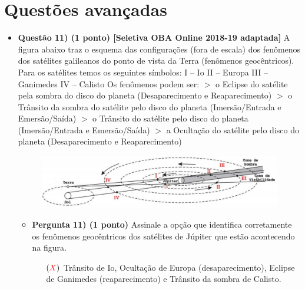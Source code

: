 \documentclass[a4paper, 12pt]{article}
\newcommand{\red}[1]{\textcolor{red}{#1}}
\begin{document}
    \section*{Questões avançadas}
        \begin{flushleft} \begin{itemize}
            \item \textbf{Questão 11) (1 ponto) [Seletiva OBA Online 2018-19 adaptada]} A figura abaixo traz o esquema das configurações (fora de escala) dos fenômenos dos satélites galileanos do ponto de vista da Terra (fenômenos geocêntricos). Para os satélites temos os seguintes símbolos: \linebreak\linebreak I – Io \linebreak II – Europa \linebreak III – Ganimedes \linebreak IV – Calisto \linebreak\linebreak Os fenômenos podem ser: \linebreak $>$ o Eclipse do satélite pela sombra do disco do planeta (Desaparecimento e Reaparecimento) \linebreak $>$ o Trânsito da sombra do satélite pelo disco do planeta (Imersão/Entrada e Emersão/Saída) \linebreak $>$ o Trânsito do satélite pelo disco do planeta (Imersão/Entrada e Emersão/Saída) \linebreak $>$ a Ocultação do satélite pelo disco do planeta (Desaparecimento e Reaparecimento)
                \begin{figure}[H]
                    \centering
                    \includegraphics[scale=0.4]{img/11.png}
                \end{figure}
                \begin{itemize}
                    \item \textbf{Pergunta 11) (1 ponto)} Assinale a opção que identifica corretamente os fenômenos geocêntricos dos satélites de Júpiter que estão acontecendo na figura.
                        \begin{itemize}
                            \item[$(\red{X})$] Trânsito de Io, Ocultação de Europa (desaparecimento), Eclipse de Ganimedes (reaparecimento) e Trânsito da sombra de Calisto.

\end{itemize}
\end{itemize}
\end{itemize}
\end{flushleft}
\end{document}
